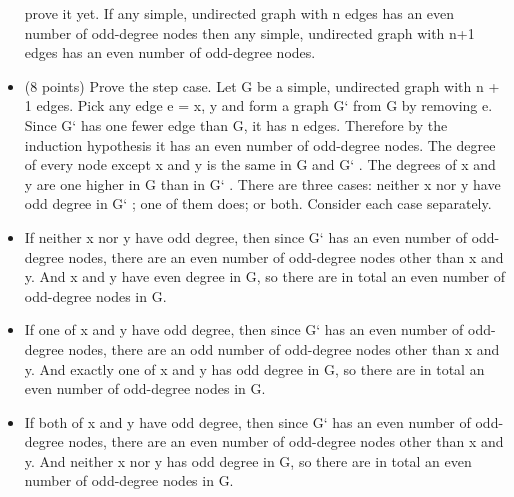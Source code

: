 \documentclass[8pt]{article}
\begin{document}
\begin{paracol}{3}
\begin{itemize}[noitemsep]
            prove it yet.
            If any simple, undirected graph with n edges has an even number of odd-degree nodes
            then any simple, undirected graph with n+1 edges has an even number of odd-degree
            nodes.
            \item  (8 points) Prove the step case.
            Let G be a simple, undirected graph with n + 1 edges. Pick any edge e = {x, y} and
            form a graph G` from G by removing e.
            Since G` has one fewer edge than G, it has n edges. Therefore by the induction
            hypothesis it has an even number of odd-degree nodes.
            The degree of every node except x and y is the same in G and G` . The degrees of x
            and y are one higher in G than in G` . There are three cases: neither x nor y have
            odd degree in G` ; one of them does; or both. Consider each case separately.
            \item  If neither x nor y have odd degree, then since G` has an even number of odd-
            degree nodes, there are an even number of odd-degree nodes other than x and
            y. And x and y have even degree in G, so there are in total an even number of
            odd-degree nodes in G.
            \item  If one of x and y have odd degree, then since G` has an even number of odd-
            degree nodes, there are an odd number of odd-degree nodes other than x and y.
            And exactly one of x and y has odd degree in G, so there are in total an even
            number of odd-degree nodes in G.
            \item  If both of x and y have odd degree, then since G` has an even number of odd-
            degree nodes, there are an even number of odd-degree nodes other than x and y.
            And neither x nor y has odd degree in G, so there are in total an even number
            of odd-degree nodes in G.
        \end{itemize}
    \end{paracol}
\end{document}

